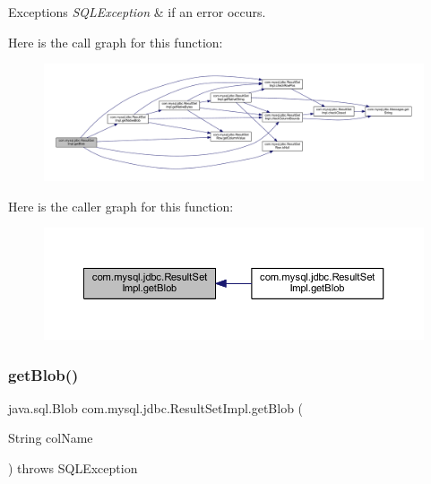 \begin{DoxyExceptions}{Exceptions}
{\em S\+Q\+L\+Exception} & if an error occurs. \\
\hline
\end{DoxyExceptions}
Here is the call graph for this function\+:
\nopagebreak
\begin{figure}[H]
\begin{center}
\leavevmode
\includegraphics[width=350pt]{classcom_1_1mysql_1_1jdbc_1_1_result_set_impl_a7b0c52d7730359b0a6dcf0f8ad4b9592_cgraph}
\end{center}
\end{figure}
Here is the caller graph for this function\+:
\nopagebreak
\begin{figure}[H]
\begin{center}
\leavevmode
\includegraphics[width=350pt]{classcom_1_1mysql_1_1jdbc_1_1_result_set_impl_a7b0c52d7730359b0a6dcf0f8ad4b9592_icgraph}
\end{center}
\end{figure}
\mbox{\label{classcom_1_1mysql_1_1jdbc_1_1_result_set_impl_a4ff048c74bbfa3ff0584ac97b8679e84}} 
\subsubsection{\texorpdfstring{get\+Blob()}{getBlob()}\hspace{0.1cm}{\footnotesize\ttfamily [2/2]}}
{\footnotesize\ttfamily java.\+sql.\+Blob com.\+mysql.\+jdbc.\+Result\+Set\+Impl.\+get\+Blob (\begin{DoxyParamCaption}\item[{String}]{col\+Name }\end{DoxyParamCaption}) throws S\+Q\+L\+Exception}

